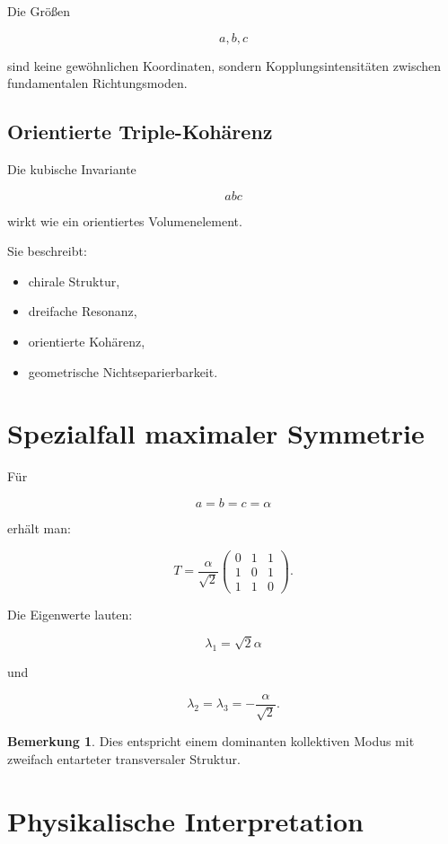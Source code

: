 \documentclass[11pt,a4paper]{article}
\theoremstyle{definition}
\newtheorem{bemerkung}{Bemerkung}
\begin{document}
	Die Größen
	
	\[
	a,b,c
	\]
	
	sind keine gewöhnlichen Koordinaten, sondern Kopplungsintensitäten zwischen fundamentalen Richtungsmoden.
	
	\subsection{Orientierte Triple-Kohärenz}
	
	Die kubische Invariante
	
	\[
	abc
	\]
	
	wirkt wie ein orientiertes Volumenelement.
	
	Sie beschreibt:
	
	\begin{itemize}
		\item chirale Struktur,
		\item dreifache Resonanz,
		\item orientierte Kohärenz,
		\item geometrische Nichtseparierbarkeit.
	\end{itemize}
	
	\section{Spezialfall maximaler Symmetrie}
	
	Für
	
	\[
	a=b=c=\alpha
	\]
	
	erhält man:
	
	\[
	T=
	\frac{\alpha}{\sqrt2}
	\begin{pmatrix}
		0&1&1\\
		1&0&1\\
		1&1&0
	\end{pmatrix}.
	\]
	
	Die Eigenwerte lauten:
	
	\[
	\lambda_1=\sqrt2\alpha
	\]
	
	und
	
	\[
	\lambda_2=\lambda_3=-\frac{\alpha}{\sqrt2}.
	\]
	
	\begin{bemerkung}
		Dies entspricht einem dominanten kollektiven Modus mit zweifach entarteter transversaler Struktur.
	\end{bemerkung}
	
	\section{Physikalische Interpretation}
	
\end{document}
